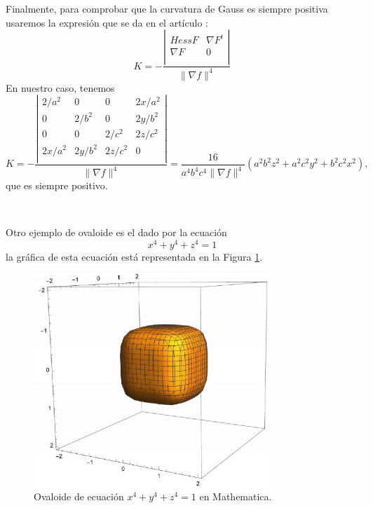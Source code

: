 \begin{ejemplo}
	
	Finalmente, para comprobar que la curvatura de Gauss es siempre positiva usaremos la expresión que se da en el artículo \cite{RonGoldman}:
	$$
		K = - \frac{ \left| {\begin{array}{cc}
				Hess F & \nabla F^t \\ 
				\nabla F & 0 \\
				\end{array} } \right| }{\| \nabla f \|^4}		 
	$$
	En nuestro caso, tenemos
	\[
		K = - \frac{ \left| {\begin{array}{cccc}
				2/a^2 & 0 & 0 & 2x/a^2 \\ 
				0 & 2/b^2 & 0 & 2y/b^2 \\ 
				0 & 0 & 2/c^2 & 2z/c^2 \\ 
				2x/a^2 & 2y/b^2 & 2z/c^2 & 0 \\
				\end{array} } \right| }{\| \nabla f \|^4}
		= \frac{16}{a^4b^4c^4 \| \nabla f \|^4}(a^2 b^2 z^2+a^2c^2y^2+b^2c^2x^2),
	\]
	que es siempre positivo.
\end{ejemplo}
${ }$\\

\begin{ejemplo}
	Otro ejemplo de ovaloide es el dado por la ecuación $$ x^4 + y^4 + z^4 = 1 $$ la gráfica de esta ecuación está representada en la Figura \ref{fig:etiq_11}.
		\begin{figure}[ht]
			\begin{center}
				\includegraphics[width=0.8\textwidth]{imagenes/ovaloide2.png}
			\end{center}
			\caption{Ovaloide de ecuación $x^4 + y^4 + z^4 = 1$ en Mathematica.}
			\label{fig:etiq_11}
		\end{figure}
\end{ejemplo}
${ }$\\


